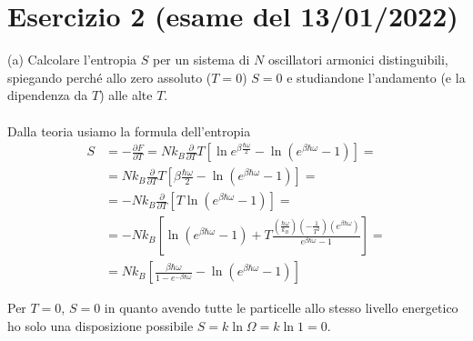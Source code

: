\documentclass[a4paper]{article}
\begin{document}
    \section*{Esercizio 2 (esame del 13/01/2022)}
        (a) Calcolare l'entropia $S$ per un sistema di $N$ oscillatori armonici distinguibili, spiegando perché allo zero assoluto ($T = 0$) $S = 0$ e studiandone l'andamento (e la dipendenza da $T$) alle alte $T$.
        \\
        \\
        Dalla teoria usiamo la formula dell'entropia
        \begin{equation*}
            \begin{split}
                S&=-\frac{\partial F}{\partial T}=Nk_B\frac{\partial}{\partial T}T\left[\ln e^{\beta\frac{\hbar\omega}{2}}-\ln (e^{\beta\hbar\omega}-1)\right]=\\
                &=Nk_B\frac{\partial}{\partial T}T\left[\beta\frac{\hbar\omega}{2}-\ln (e^{\beta\hbar\omega}-1)\right]=\\
                &=-Nk_B\frac{\partial}{\partial T}\left[T\ln (e^{\beta\hbar\omega}-1)\right]=\\
                &=-Nk_B\left[\ln (e^{\beta\hbar\omega}-1)+T\frac{\left(\frac{\hbar\omega}{k_B}\right)\left(-\frac{1}{T^2}\right)(e^{\beta\hbar\omega})}{e^{\beta\hbar\omega}-1}\right]=\\
                &=Nk_B\left[\frac{\beta\hbar\omega}{1-e^{-\beta\hbar\omega}}-\ln (e^{\beta\hbar\omega}-1)\right]             
            \end{split}
        \end{equation*}
        \begin{center}
        \end{center}
        Per $T = 0$, $S = 0$ in quanto avendo tutte le particelle allo stesso livello energetico ho solo una disposizione possibile $S=k\ln\Omega=k\ln 1=0$.
\end{document}
